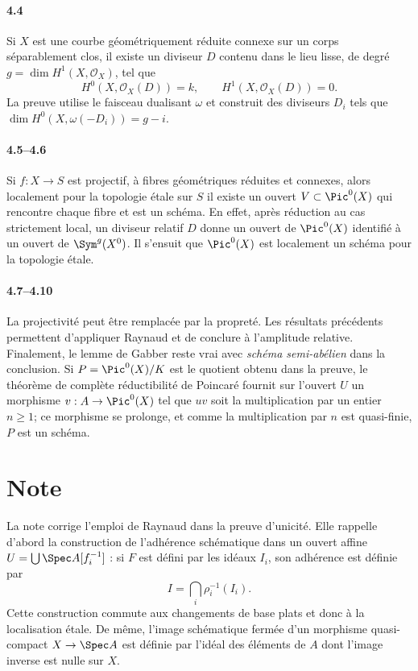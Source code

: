 \paragraph{4.4}
Si $X$ est une courbe géométriquement réduite connexe sur un corps séparablement clos, il existe un diviseur $D$ contenu dans le lieu lisse, de degré $g=\dim H^1(X,\mathcal O_X)$, tel que
\[
  H^0(X,\mathcal O_X(D))=k,
  \qquad
  H^1(X,\mathcal O_X(D))=0.
\]
La preuve utilise le faisceau dualisant $\omega$ et construit des diviseurs $D_i$ tels que $\dim H^0(X,\omega(-D_i))=g-i$.

\paragraph{4.5--4.6}
Si $f:X\to S$ est projectif, à fibres géométriques réduites et connexes, alors localement pour la topologie étale sur $S$ il existe un ouvert $V\subset\Pic^0(X)$ qui rencontre chaque fibre et est un schéma. En effet, après réduction au cas strictement local, un diviseur relatif $D$ donne un ouvert de $\Pic^0(X)$ identifié à un ouvert de $\Sym^g(X^0)$. Il s'ensuit que $\Pic^0(X)$ est localement un schéma pour la topologie étale.

\paragraph{4.7--4.10}
La projectivité peut être remplacée par la propreté. Les résultats précédents permettent d'appliquer Raynaud et de conclure à l'amplitude relative. Finalement, le lemme de Gabber reste vrai avec \emph{schéma semi-abélien} dans la conclusion. Si $P=\Pic^0(X)/K$ est le quotient obtenu dans la preuve, le théorème de complète réductibilité de Poincaré fournit sur l'ouvert $U$ un morphisme $v:A\to\Pic^0(X)$ tel que $uv$ soit la multiplication par un entier $n\ge1$; ce morphisme se prolonge, et comme la multiplication par $n$ est quasi-finie, $P$ est un schéma.

\section*{Note}

La note corrige l'emploi de Raynaud dans la preuve d'unicité. Elle rappelle d'abord la construction de l'adhérence schématique dans un ouvert affine $U=\bigcup \Spec A[f_i^{-1}]$ : si $F$ est défini par les idéaux $I_i$, son adhérence est définie par
\[
  I=\bigcap_i\rho_i^{-1}(I_i).
\]
Cette construction commute aux changements de base plats et donc à la localisation étale. De même, l'image schématique fermée d'un morphisme quasi-compact $X\to\Spec A$ est définie par l'idéal des éléments de $A$ dont l'image inverse est nulle sur $X$.

